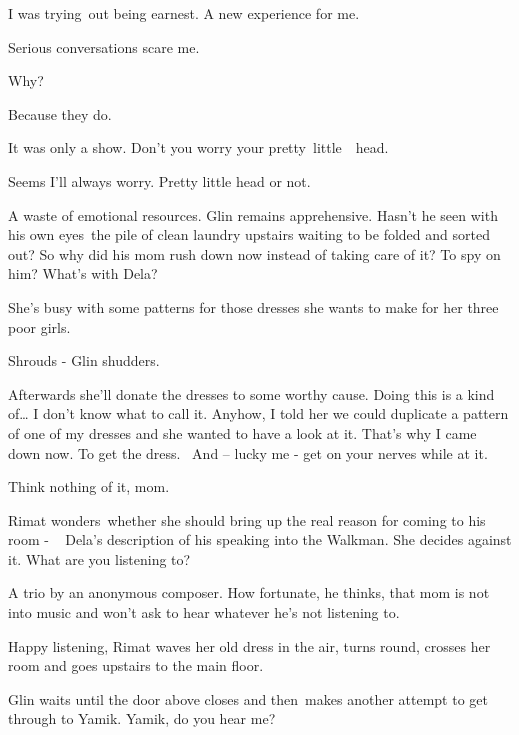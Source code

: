\documentclass[twoside,11pt]{book}
\begin{document}
{\textquotedbl}I was trying~out being earnest. A new experience for me.{\textquotedbl}

{\textquotedbl}Serious conversations scare me.{\textquotedbl} 

{\textquotedbl}Why?{\textquotedbl} 

{\textquotedbl}Because they do.{\textquotedbl} 

{\textquotedbl}It was only a show. Don't you worry your pretty\ little\ \ head.{\textquotedbl}

{\textquotedbl}Seems I'll always worry. Pretty little head or not.{\textquotedbl} 

{\textquotedbl}A waste of emotional resources.{\textquotedbl} Glin remains apprehensive. Hasn't he seen with his own
eyes~the pile of clean laundry upstairs waiting to be folded and sorted out? So why did his mom rush down now instead
of taking care of it? To spy on him? {\textquotedbl}What's with Dela?{\textquotedbl}~ 

{\textquotedbl}She's busy with some patterns for those dresses she wants to make for her three poor
girls.{\textquotedbl} 

{\textquotedbl}Shrouds - {\textquotedbl} Glin shudders. 

{\textquotedbl}Afterwards she'll donate the dresses to some worthy cause. Doing this is a kind of{\dots} I don't know
what to call it. Anyhow, I told her we could duplicate a pattern of one of my dresses and she wanted to have a look at
it. That's why I came down now. To get the dress. ~And -- lucky me - get on your nerves while at it.{\textquotedbl} 

{\textquotedbl}Think nothing of it, mom.{\textquotedbl} 

Rimat wonders~whether she should bring up the real reason for coming to his room - ~ Dela's description of his speaking
into the Walkman. She decides against it. {\textquotedbl}What are you listening to?{\textquotedbl} 

{\textquotedbl}A trio by an anonymous composer.{\textquotedbl} How fortunate, he thinks, that mom is not into music and
won't ask to hear whatever he's  not listening to. 

{\textquotedbl}Happy listening,{\textquotedbl} Rimat waves her old dress in the air, turns round, crosses her room and
goes upstairs to the main floor.

Glin waits until the door above closes and then~makes another attempt to get through to Yamik. {\textquotedbl}Yamik, do
you hear me?{\textquotedbl} 
\end{document}
